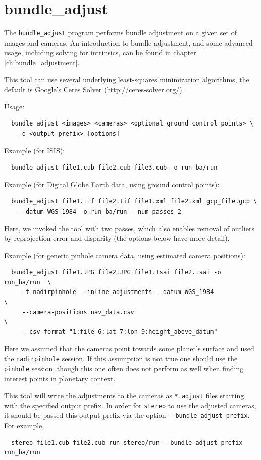 \newpage
\section{bundle\_adjust}
\label{bundleadjust}

The \texttt{bundle\_adjust} program performs bundle adjustment on a
given set of images and cameras. An introduction to bundle adjustment,
and some advanced usage, including solving for intrinsics, 
can be found in chapter \ref{ch:bundle_adjustment}.

This tool can use several underlying least-squares minimization
algorithms, the default is Google's Ceres Solver
(\url{http://ceres-solver.org/}).

Usage:
\begin{verbatim}
  bundle_adjust <images> <cameras> <optional ground control points> \
    -o <output prefix> [options]
\end{verbatim}

Example (for ISIS):
\begin{verbatim}
  bundle_adjust file1.cub file2.cub file3.cub -o run_ba/run
\end{verbatim}

Example (for Digital Globe Earth data, using ground control points):
\begin{verbatim}
  bundle_adjust file1.tif file2.tif file1.xml file2.xml gcp_file.gcp \
    --datum WGS_1984 -o run_ba/run --num-passes 2
\end{verbatim}
Here, we invoked the tool with two passes, which also enables removal of outliers
by reprojection error and disparity (the options below have more detail).

Example (for generic pinhole camera data, using estimated camera positions):
\begin{verbatim}
  bundle_adjust file1.JPG file2.JPG file1.tsai file2.tsai -o run_ba/run  \
     -t nadirpinhole --inline-adjustments --datum WGS_1984               \
     --camera-positions nav_data.csv                                     \
     --csv-format "1:file 6:lat 7:lon 9:height_above_datum"
\end{verbatim}

Here we assumed that the cameras point towards some planet's surface and
used the \texttt{nadirpinhole} session. If this assumption is not true
one should use the \texttt{pinhole} session, though this one
often does not perform as well when finding interest points in planetary context. 

This tool will write the adjustments to the cameras as \texttt{*.adjust}
files starting with the specified output prefix. In order for
\texttt{stereo} to use the adjusted cameras, it should be passed
this output prefix via the option \texttt{-\/-bundle-adjust-prefix}. For example,
\begin{verbatim}
  stereo file1.cub file2.cub run_stereo/run --bundle-adjust-prefix run_ba/run
\end{verbatim}

